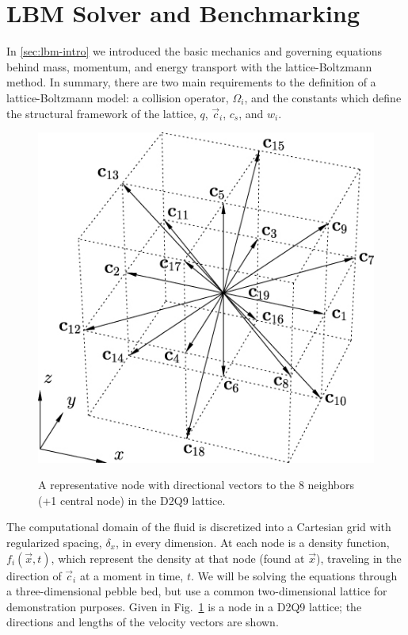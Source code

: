 \section{LBM Solver and Benchmarking}\label{sec:lbm-benchmark}

In \cref{sec:lbm-intro} we introduced the basic mechanics and governing equations behind mass, momentum, and energy transport with the lattice-Boltzmann method. In summary, there are two main requirements to the definition of a lattice-Boltzmann model: a collision operator, $\Omega_i$, and the constants which define the structural framework of the lattice, $q$, $\vec{c}_i$, $c_s$, and $w_i$.

\begin{figure}[t]
	\centering
	\caption{A representative node with directional vectors to the 8 neighbors (+1 central node) in the D2Q9 lattice.}
	\includegraphics[width=\singleimagewidth]{chapters/figures/lbm/4193301.jpg}\label{fig:d2q9-lattice}
\end{figure}

The computational domain of the fluid is discretized into a Cartesian grid with regularized spacing, $\delta_x$, in every dimension. At each node is a density function, $f_i(\vec{x},t)$, which represent the density at that node (found at $\vec{x}$), traveling in the direction of $\vec{c}_i$ at a moment in time, $t$. We will be solving the equations through a three-dimensional pebble bed, but use a common two-dimensional lattice for demonstration purposes. Given in Fig.~\ref{fig:d2q9-lattice} is a node in a D2Q9 lattice; the directions and lengths of the velocity vectors are shown.

